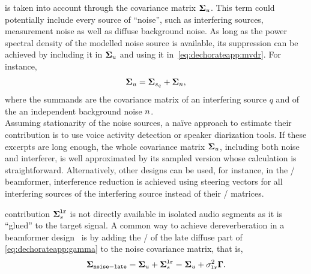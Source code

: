  is taken into account through the covariance matrix $\boldsymbol{\Sigma}_u$.
This term could potentially include every source of ``noise'', such as interfering sources, measurement noise as well as diffuse background noise.
As long as the power spectral density of the modelled noise source is available, its suppression can be achieved by including it in $\boldsymbol{\Sigma}_u$ and using it in~\cref{eq:dechorateapp:mvdr}. 
For instance,
\begin{equation}
    \boldsymbol{\Sigma}_u = \boldsymbol{\Sigma}_{s_q} + \boldsymbol{\Sigma}_{n}
    ,
\end{equation}
where the summands are the covariance matrix of an interfering source $q$ and of the an independent background noise $n$.
\\Assuming stationarity of the noise sources, a na\"ive approach to estimate their contribution is to use voice activity detection or speaker diarization tools.
If these excerpts are long enough, the whole covariance matrix $\boldsymbol{\Sigma}_u$, including both noise and interferer, is well approximated by its sampled version whose calculation is straightforward.
Alternatively, other designs can be used, for instance, in the \LCMVtxt/ beamformer, interference reduction is achieved using steering vectors for all interfering sources of the interfering source instead of their \PSD/ matrices.

 contribution $\boldsymbol{\Sigma}_{s}^{\mathtt{lr}}$ is not directly available in isolated audio segments as it is ``glued'' to the target signal.
A common way to achieve dereverberation in a beamformer design~ is by adding
the \PSD/ of the late diffuse part of \cref{eq:dechorateapp:gamma} to the noise covariance matrix, that is,
\begin{equation}
    \boldsymbol{\Sigma}_{\mathtt{noise-late}} =  \boldsymbol{\Sigma}_{u} + \boldsymbol{\Sigma}_{s}^{\mathtt{lr}} =  \boldsymbol{\Sigma}_{u} + \sigma_{\mathtt{lr}}^2\mathbf{\Gamma}
    .
\end{equation}


